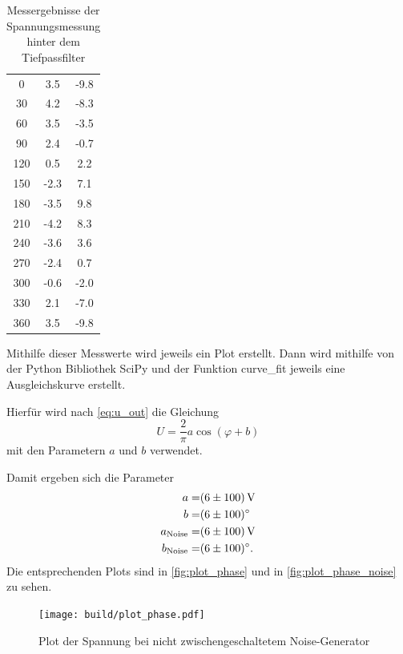 \begin{table}
    \centering
    \begin{tabular}{S[table-format=3.0] S[table-format=-1.1] S[table-format=-1.1]}
        \toprule
        \tableSI{\varphi}{\degree} &  &  \\
         & 3.5 & -9.8 \\
        30 & 4.2 & -8.3 \\
        60 & 3.5 & -3.5 \\
        90 & 2.4 & -0.7 \\
        120 & 0.5 & 2.2 \\
        150 & -2.3 & 7.1 \\
        180 & -3.5 & 9.8 \\
        210 & -4.2 & 8.3 \\
        240 & -3.6 & 3.6 \\
        270 & -2.4 & 0.7 \\
        300 & -0.6 & -2.0 \\
        330 & 2.1 & -7.0 \\
        360 & 3.5 & -9.8 \\
        \bottomrule
    \end{tabular}
    \caption{Messergebnisse der Spannungsmessung hinter dem Tiefpassfilter}
    \label{tab:phase}
\end{table}

Mithilfe dieser Messwerte wird jeweils ein Plot erstellt.
Dann wird mithilfe von der Python Bibliothek SciPy und der Funktion curve\_fit jeweils eine Ausgleichskurve erstellt.

Hierfür wird nach \autoref{eq:u_out} die Gleichung
\begin{equation}
    U = \frac{2}{\pi}  a \cos(\varphi+b)
\end{equation}
mit den Parametern $a$ und $b$ verwendet.

Damit ergeben sich die Parameter
\begin{align*}
    a =& \SI{6+-100}{\volt} \\
    b =& \SI{6+-100}{\degree} \\
    a_\text{Noise} =& \SI{6+-100}{\volt} \\
    b_\text{Noise} =& \SI{6+-100}{\degree}.
\end{align*}
Die entsprechenden Plots sind in \autoref{fig:plot_phase} und in \autoref{fig:plot_phase_noise} zu sehen.

\begin{figure}
    \centering
    \texttt{[image: build/plot\_phase.pdf]}
    \caption{Plot der Spannung bei nicht zwischengeschaltetem Noise-Generator}
    \label{fig:plot_phase}
\end{figure}


